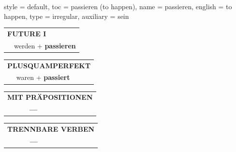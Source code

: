 \begin{verbentry}{
  style = {default},
  toc = {passieren (to happen)},
  name = {passieren},
  english = {to happen},
  type = {irregular},
  auxiliary = {sein}
}
\begin{tabular}{rl}
    \multicolumn{2}{l}{\textbf{FUTURE I} }\\
   & werden + \textbf{passieren}\\
 
  \end{tabular}
\hfill
   \begin{tabular}{rl}
      \multicolumn{2}{l}{\textbf{PLUSQUAMPERFEKT}}\\
   & waren + \textbf{passiert}\\
  \end{tabular}
  
  \vspace{10pt}



\begin{tabular}{lll}
\multicolumn{3}{l}{\textbf{MIT PRÄPOSITIONEN}}\\
& \textbf{---} & \\
\end{tabular}
\hfill
\begin{tabular}{lll}
\multicolumn{3}{l}{\textbf{TRENNBARE VERBEN}}\\
& \textbf{---} & \\
\end{tabular}

\vspace{-5pt}
\end{verbentry}

